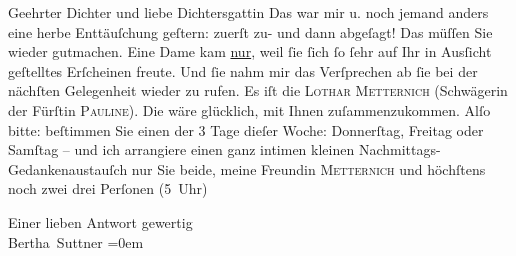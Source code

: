 \pstart\center{}Geehrter Dichter und liebe Dichtersgattin\pend\vspace{0.5em}
\pstart
           Das war mir u. noch jemand anders eine herbe Enttäuſchung geſtern: zuerſt zu- und
               dann abgeſagt! Das müſſen Sie wieder gutmachen. Eine Dame kam \uline{nur}, weil{ }ſie{ }ſich{ }ſo{ }ſehr auf Ihr in Ausſicht geſtelltes Erſcheinen
                   freute. Und{ }ſie nahm mir das Verſprechen ab{ }ſie
               bei der nächſten Gelegenheit wieder zu rufen. Es iſt die \label{K_L02170-1v}\label{K_L02170-1}{ }\textsc{Lothar Metternich} (Schwägerin der Fürſtin \textsc{Pauline}). Die wäre glücklich, mit Ihnen zuſammenzukommen. Alſo bitte: beſtimmen Sie
               einen der 3 Tage dieſer Woche: Donnerſtag, Freitag oder Samſtag – und {\pb}ich arrangiere einen ganz intimen kleinen
               Nachmittags-Gedankenaustauſch nur Sie beide, meine Freundin \textsc{Metternich} und höchſtens noch zwei drei Perſonen (5 Uhr)\pend
           
\pstart
           Einer lieben Antwort gewertig{\\[\baselineskip]}\spacefill\mbox{Bertha Suttner}\pend
           \leftskip=0em{}\endnumbering{}  \newcommand{\dateiname}{L02170}\newcommand{\titel}{Bertha von Suttner an Arthur und Olga Schnitzler, 30. 3. 1914}\newcommand{\editorInnen}{Martin Anton Müller und Gerd-Hermann Susen}
